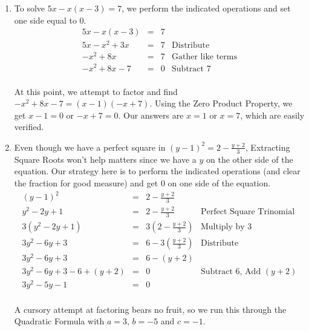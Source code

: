 \documentclass{ximera}
\begin{document}
\begin{example}
\begin{explanation}
\begin{enumerate}
\item To solve $5x - x(x-3) = 7$, we perform the indicated operations and set one side equal to $0$.\[ \begin{array}{rclr}

5x - x(x-3) & = & 7 & \\

5x - x^2 + 3x & = & 7 & \text{Distribute} \\

-x^2 + 8x & = & 7 & \text{Gather like terms} \\

-x^2 + 8x - 7 & = & 0& \text{Subtract $7$} \\

\end{array}\]

At this point, we attempt to factor and find $-x^2 + 8x - 7 = (x-1)(-x+7)$.  Using the Zero Product Property, we get $x-1 = 0$  or $-x+7 = 0$.  Our answers are $x = 1$ or $x = 7$, which are easily verified.

\item Even though we have a perfect square in $(y-1)^2 = 2 - \frac{y+2}{3}$, Extracting Square Roots won't help matters since we have a $y$ on the other side of the equation.  Our strategy here is to perform the indicated operations (and clear the fraction for good measure) and get $0$ on one side of the equation.\[ \begin{array}{rclr}

(y-1)^2 & = &  2 - \frac{y+2}{3} & \\  

y^2 - 2y + 1 & = & 2 - \frac{y+2}{3} & \text{Perfect Square Trinomial}\\  

3(y^2 - 2y + 1) & = & 3\left(2 - \frac{y+2}{3} \right) & \text{Multiply by $3$} \\  
3y^2 - 6y + 3 & = & 6 - 3\left(\frac{y+2}{3}\right) & \text{Distribute} \\  

3y^2 - 6y + 3 & = & 6 - (y+2) & \\

3y^2 - 6y + 3 - 6 + (y+2) & = & 0 & \text{Subtract $6$, Add $(y+2)$}\\

3y^2 - 5y - 1 & = & 0 & \\

\end{array}\]

A cursory attempt at factoring bears no fruit, so we run this through the Quadratic Formula with $a = 3$, $b = -5$ and $c = -1$. \[ \begin{array}{rclr}


\end{array}\]
\end{enumerate}
\end{explanation}
\end{example}
\end{document}
